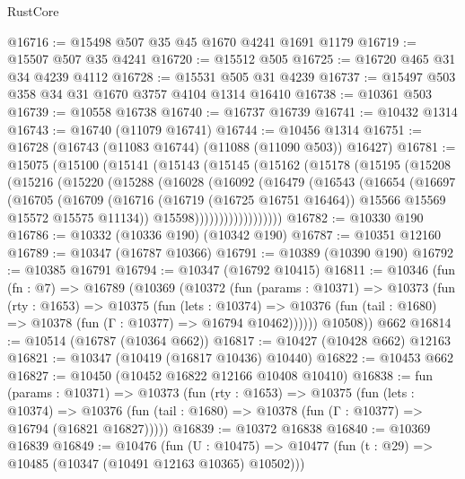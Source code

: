 \begin{lexlean}{RustCore}
\begin{coremodule}
@16716 := @15498 @507 @35 @45 @1670 @4241 @1691 @1179
@16719 := @15507 @507 @35 @4241
@16720 := @15512 @505
@16725 := @16720 @465 @31 @34 @4239 @4112
@16728 := @15531 @505 @31 @4239
@16737 := @15497 @503 @358 @34 @31 @1670 @3757 @4104 @1314 @16410
@16738 := @10361 @503
@16739 := @10558 @16738
@16740 := @16737 @16739
@16741 := @10432 @1314
@16743 := @16740 (@11079 @16741)
@16744 := @10456 @1314
@16751 := @16728 (@16743 (@11083 @16744) (@11088 (@11090 @503)) @16427)
@16781 := @15075
    (@15100
      (@15141
        (@15143
          (@15145
            (@15162
              (@15178
                (@15195
                  (@15208
                    (@15216
                      (@15220
                        (@15288
                          (@16028
                            (@16092
                              (@16479
                                (@16543
                                  (@16654
                                    (@16697
                                      (@16705
                                        (@16709
                                          (@16716
                                            (@16719 (@16725 @16751 @16464))
                                            @15566
                                            @15569
                                            @15572
                                            @15575
                                            @11134))
                                        @15598))))))))))))))))))
@16782 := @10330 @190
@16786 := @10332 (@10336 @190) (@10342 @190)
@16787 := @10351 @12160
@16789 := @10347 (@16787 @10366)
@16791 := @10389 (@10390 @190)
@16792 := @10385 @16791
@16794 := @10347 (@16792 @10415)
@16811 := @10346
    (fun (fn : @7) =>
    @16789
      (@10369
        (@10372
          (fun (params : @10371) =>
          @10373
            (fun (rty : @1653) =>
            @10375
              (fun (lets : @10374) =>
              @10376 (fun (tail : @1680) => @10378 (fun (Γ : @10377) => @16794 @10462))))))
        @10508))
    @662
@16814 := @10514 (@16787 (@10364 @662))
@16817 := @10427 (@10428 @662) @12163
@16821 := @10347 (@10419 (@16817 @10436) @10440)
@16822 := @10453 @662
@16827 := @10450 (@10452 @16822 @12166 @10408 @10410)
@16838 := fun (params : @10371) =>
  @10373
    (fun (rty : @1653) =>
    @10375
      (fun (lets : @10374) =>
      @10376 (fun (tail : @1680) => @10378 (fun (Γ : @10377) => @16794 (@16821 @16827)))))
@16839 := @10372 @16838
@16840 := @10369 @16839
@16849 := @10476
    (fun (U : @10475) => @10477 (fun (t : @29) => @10485 (@10347 (@10491 @12163 @10365) @10502)))

\end{coremodule}
\end{lexlean}
